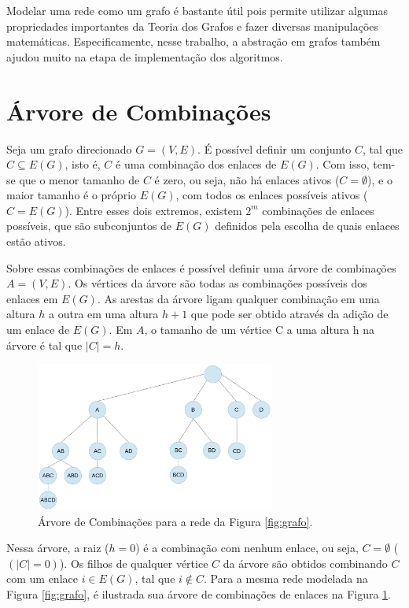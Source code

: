 Modelar uma rede como um grafo é bastante útil pois permite utilizar algumas propriedades importantes da Teoria dos Grafos e fazer diversas manipulações matemáticas. Especificamente, nesse trabalho, a abstração em grafos também ajudou muito na etapa de implementação dos algoritmos.

\section{Árvore de Combinações}

Seja um grafo direcionado $G=(V,E)$. É possível definir um conjunto $C$, tal que $C \subseteq E(G)$, isto é, $C$ é uma combinação dos enlaces de $E(G)$. Com isso, tem-se que o menor tamanho de $C$ é zero, ou seja, não há enlaces ativos ($C=\emptyset$), e o maior tamanho é o próprio $E(G)$, com todos os enlaces possíveis ativos ($C=E(G)$). Entre esses dois extremos, existem $2^m$ combinações de enlaces possíveis, que são subconjuntos de $E(G)$ definidos pela escolha de quais enlaces estão ativos.

Sobre essas combinações de enlaces é possível definir uma árvore de combinações $A=(V,E)$. Os vértices da árvore são todas as combinações possíveis dos enlaces em $E(G)$. As arestas da árvore ligam qualquer combinação em uma altura $h$ a outra em uma altura $h+1$ que pode ser obtido através da adição de um enlace de $E(G)$. Em $A$, o tamanho de um vértice C a uma altura h na árvore é tal que $|C|=h$.

\begin{figure}[htb]
\centering
\includegraphics[width=0.7\textwidth]{figs/arvore}
\caption[Árvore de Combinações para a rede da Figura \ref{fig:grafo}.]
{Árvore de Combinações para a rede da Figura \ref{fig:grafo}.}
\label{fig:arvore}
\end{figure}

Nessa árvore, a raiz ($h=0$) é a combinação com nenhum enlace, ou seja, $C=\emptyset$ ($(|C|=0)$). Os filhos de qualquer vértice $C$ da árvore são obtidos combinando $C$ com um enlace $i \in E(G)$, tal que $i \notin C$. Para a mesma rede modelada na Figura \ref{fig:grafo}, é ilustrada sua árvore de combinações de enlaces na Figura \ref{fig:arvore}.

